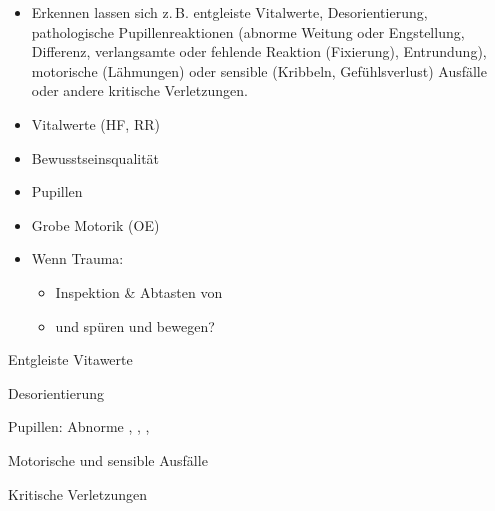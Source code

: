{\begin{itemize}
  \item[\eye] Erkennen lassen sich z.\,B. entgleiste
Vitalwerte, Desorientierung, pathologische
Pupillenreaktionen (abnorme Weitung oder Engstellung,
Differenz, verlangsamte oder fehlende Reaktion (Fixierung),
Entrundung), motorische (Lähmungen) oder sensible (Kribbeln,
Gefühlsverlust) Ausfälle oder andere kritische Verletzungen.
\end{itemize}
}{
\begin{itemize}
  \item Vitalwerte (HF, RR)
  \item Bewusstseinsqualität
  \item Pupillen
  \item Grobe Motorik (OE)
  \item Wenn Trauma:
  \begin{itemize}
    \item Inspektion \& Abtasten von
    \item {} und  spüren und bewegen?
  \end{itemize}
\end{itemize}\begin{compactitem}
  \item[\eye] Entgleiste Vitawerte
  \item[\eye] Desorientierung
  \item[\eye] Pupillen: Abnorme , ,
  , 
  \item[\eye] Motorische und sensible Ausfälle
  \item[\eye] Kritische Verletzungen
\end{compactitem}
}{}{}{}

